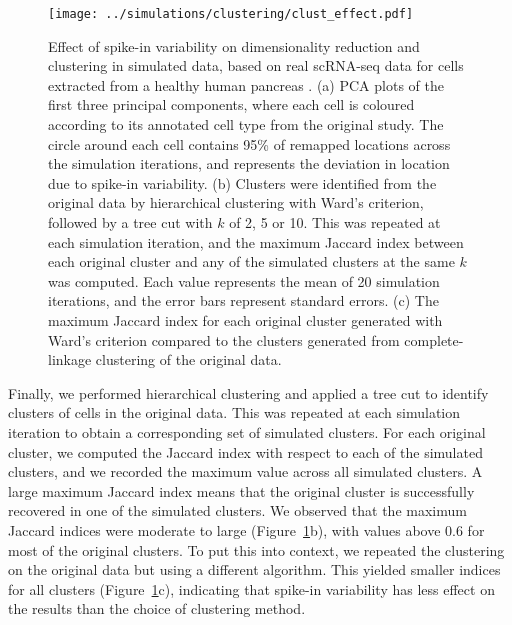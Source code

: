 \documentclass{article}
\begin{document}
\begin{figure}[btp]
    \begin{center}
        \texttt{[image: ../simulations/clustering/clust\_effect.pdf]}
    \end{center}
    \caption{Effect of spike-in variability on dimensionality reduction and clustering in simulated data,
        based on real scRNA-seq data for cells extracted from a healthy human pancreas \cite{segerstople2016single}.
        (a) PCA plots of the first three principal components, where each cell is coloured according to its annotated cell type from the original study. 
        The circle around each cell contains 95\% of remapped locations across the simulation iterations, and represents the deviation in location due to spike-in variability.
        (b) Clusters were identified from the original data by hierarchical clustering with Ward's criterion, followed by a tree cut with $k$ of 2, 5 or 10.
        This was repeated at each simulation iteration, and the maximum Jaccard index between each original cluster and any of the simulated clusters at the same $k$ was computed.
        Each value represents the mean of 20 simulation iterations, and the error bars represent standard errors.
        (c) The maximum Jaccard index for each original cluster generated with Ward's criterion compared to the clusters generated from complete-linkage clustering of the original data.
    }
    \label{fig:dimclust}
\end{figure}

Finally, we performed hierarchical clustering and applied a tree cut to identify clusters of cells in the original data.
This was repeated at each simulation iteration to obtain a corresponding set of simulated clusters.
For each original cluster, we computed the Jaccard index with respect to each of the simulated clusters, and we recorded the maximum value across all simulated clusters.
A large maximum Jaccard index means that the original cluster is successfully recovered in one of the simulated clusters.
We observed that the maximum Jaccard indices were moderate to large (Figure~\ref{fig:dimclust}b), with values above 0.6 for most of the original clusters.
To put this into context, we repeated the clustering on the original data but using a different algorithm.
This yielded smaller indices for all clusters (Figure~\ref{fig:dimclust}c), indicating that spike-in variability has less effect on the results than the choice of clustering method.
\end{document}

